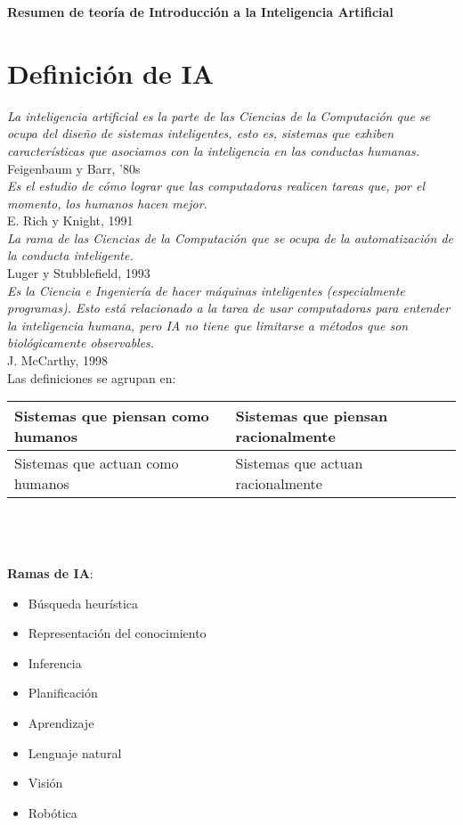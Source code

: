 \documentclass[a4paper,10pt]{paper}
\begin{document}
\textbf{\LARGE Resumen de teor\'ia de Introducci\'on a la
Inteligencia Artificial}

\section{Definición de IA}

\textit{La inteligencia artificial es la parte de las Ciencias de la Computación que
se ocupa del diseño de sistemas inteligentes, esto es, sistemas que exhiben
características que asociamos con la inteligencia en las conductas humanas.}\\
Feigenbaum y Barr, '80s\\

\textit{Es el estudio de cómo lograr que las computadoras realicen tareas que, por el
momento, los humanos hacen mejor.}\\
E. Rich y Knight, 1991\\

\textit{La rama de las Ciencias de la Computación que se ocupa de la automatización
de la conducta inteligente.}\\
Luger y Stubblefield, 1993\\

\textit{Es la Ciencia e Ingeniería de hacer máquinas inteligentes (especialmente
programas). Esto está relacionado a la tarea de usar computadoras para
entender la inteligencia humana, pero IA no tiene que limitarse a métodos
que son biológicamente observables.}\\
J. McCarthy, 1998\\

Las definiciones se agrupan en:\\
\begin{tabular}{| p{6cm} | p{6cm} |}
\hline
Sistemas que piensan como humanos &
Sistemas que piensan racionalmente \\
\hline
Sistemas que actuan como humanos &
Sistemas que actuan racionalmente \\
\hline
\end{tabular}
\\
\\
\\
\textbf{Ramas de IA}:
\begin{itemize}
    \item Búsqueda heurística
    \item Representación del conocimiento
    \item Inferencia
    \item Planificación
    \item Aprendizaje
    \item Lenguaje natural
    \item Visión
    \item Robótica
\end{itemize}
\end{document}
